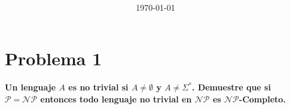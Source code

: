 \documentclass[spanish]{article}
\title{\task \\ {\normalsize \class \\ \institution \\}}
\author{\me}
\date{\today}
\begin{document}
\maketitle
\newpage
\tableofcontents
\newpage

\section{Problema 1}
\textbf{Un lenguaje $A$ es no trivial si $A\neq\emptyset$ y $A\neq\Sigma^{*}$. Demuestre que si $\mathcal{P} = \mathcal{NP}$ entonces todo lenguaje no trivial en $\mathcal{NP}$ es $\mathcal{NP}$-Completo.}
\end{document}
